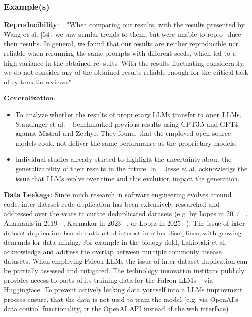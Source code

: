 \subsubsection{Example(s)}
\textbf{Reproducibility}:
~\cite{DBLP:conf/sigir-ap/StaudingerKPLH24} "When comparing our results, with the results presented by Wang et al. [54], we saw similar trends to them, but were unable to repro- duce their results. In general, we found that our results are neither reproducible nor reliable when rerunning the same prompts with different seeds, which led to a high variance in the obtained re- sults. With the results fluctuating considerably, we do not consider any of the obtained results reliable enough for the critical task of systematic reviews."

\textbf{Generalization}:
\begin{itemize}
  \item To analyze whether the results of proprietary LLMs transfer to open LLMs, Staudinger et al. ~\cite{DBLP:conf/sigir-ap/StaudingerKPLH24} benchmarked previous results using GPT3.5 and GPT4 against Mistral and Zephyr. They found, that the employed open source models could not deliver the same performance as the proprietary models.
  \item Individual studies already started to highlight the uncertainty about the generalizability of their results in the future. In ~\cite{DBLP:conf/msr/JesseADM23} Jesse et al. acknowledge the issue that LLMs evolve over time and this evolution impact the generation.
\end{itemize}

\textbf{Data Leakage}:
Since much research in software engineering evolves around code, inter-dataset code duplication has been extensively researched and addressed over the years to curate deduplicated datasets (e.g. by Lopes in 2017 ~\cite{DBLP:journals/pacmpl/LopesMMSYZSV17}, Allamanis in 2019 ~\cite{10.1145/3359591.3359735}, Karmakar in 2023 ~\cite{DBLP:journals/ese/KarmakarAR23}, or Lopez in 2025 ~\cite{DBLP:journals/tse/LopezCSSV25}).
The issue of inter-dataset duplication has also attracted interest in other disciplines, with growing demands for data mining. For example in the biology field, Lakiotaki et al. ~\cite{DBLP:journals/biodb/LakiotakiVTGT18} acknowledge and address the overlap between multiple commonly disease datasets. 
When employing Falcon LLMs the issue of inter-dataset duplication can be partially assessed and mitigated. The technology innovation institute publicly provides access to parts of its training data for the Falcon LLMs ~\cite{technology_innovation_institute_2023} via Huggingface.
To prevent actively leaking data yourself into a LLMs improvment process ensure, that the data is not used to train the model (e.g. via OpenAI's data control functionality, or the OpenAI API instead of the web interface) ~\cite{DBLP:conf/eacl/BalloccuSLD24}.

